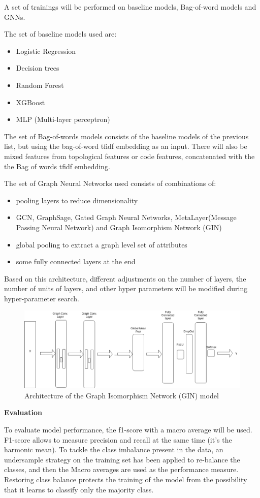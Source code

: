 
A set of trainings will be performed on baseline models, Bag-of-word models and GNNs.

The set of baseline models used are:
\begin{itemize}
	\item Logistic Regression
	\item Decision trees
	\item Random Forest
	\item XGBoost
	\item MLP (Multi-layer perceptron)
\end{itemize}

The set of Bag-of-words models consists of the baseline models of the previous list, but using the bag-of-word tfidf embedding as an input. There will also be mixed features from topological features or code features, concatenated with the the Bag of words tfidf embedding.

The set of Graph Neural Networks used consists of combinations of:
\begin{itemize}
	\item pooling layers to reduce dimensionality
	\item GCN, GraphSage, Gated Graph Neural Networks, MetaLayer(Message Passing Neural Network) and Graph Isomorphism Network (GIN)
	\item global pooling to extract a graph level set of attributes
	\item some fully connected layers at the end
\end{itemize}

Based on this architecture, different adjustments on the number of layers, the number of units of layers, and other hyper parameters will be modified during hyper-parameter search.


\begin{figure}[H]
    \centering
        \includegraphics[width=0.85\linewidth]{img/GN_exp2_GIN.png}
    \caption{Architecture of the Graph Isomorphism Network (GIN) model}\label{fig:gin_diagram}
\end{figure}



\textbf{Evaluation}

To evaluate model performance, the f1-score with a macro average will be used. F1-score allows to measure precision and recall at the same time (it's the harmonic mean). To tackle the class imbalance present in the data, an undersample strategy on the training set has been applied to re-balance the classes, and then the Macro averages are used as the performance measure. Restoring class balance protects the training of the model from the possibility that it learns to classify only the majority class.
